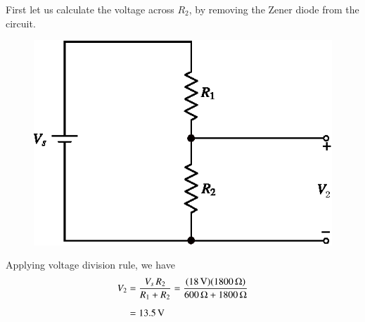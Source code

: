 \begin{solution}
First let us calculate the voltage across $R_{2}$, by removing the Zener diode from the circuit.
\begin{figure}[H]
\centering
\includegraphics{chap2/sol2.29a.eps}
\end{figure}

Applying voltage division rule, we have
\begin{align*}
V_{2} &= \dfrac{V_{s}\,R_{2}}{R_{1}+R_{2}}=\dfrac{(18\text{\,V})(1800\,\Omega)}{600\,\Omega+1800\,\Omega}\\[5pt]
&= 13.5\text{\,V}
\end{align*}


\end{solution}
